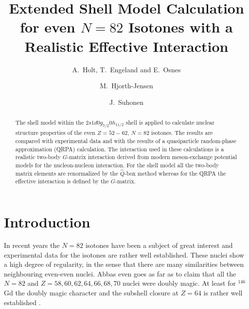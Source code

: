


\begin{frontmatter}

\title{Extended Shell Model Calculation for even $N=82$ Isotones with a 
Realistic Effective Interaction}

\author{A.\ Holt, T.\ Engeland and E.\ Osnes}

\address{Department of Physics, University of Oslo, N-0316 Oslo, Norway}

\author{M.\ Hjorth-Jensen}

\address{Nordita, Blegdamsvej 17, DK-2100 K\o benhavn \O, Denmark}

\author{J.\ Suhonen}

\address{Department of Physics, University of Jyv\"{a}skyl\"{a},
              P.O.Box 35, FIN-40351 Jyv\"{a}skyl\"{a}, Finland}

\maketitle

\begin{abstract}
The shell model within the $2s1d0g_{7/2}0h_{11/2}$ shell is applied to 
calculate nuclear structure properties of the even $Z=52 - 62$, $N=82$ 
isotones. The results are compared with experimental data and with the 
results of a quasiparticle random-phase approximation (QRPA) calculation.
The interaction used in these calculations is a realistic 
two-body $G$-matrix
interaction derived from modern meson-exchange potential models for the
nucleon-nucleon interaction. 
For the shell model all the 
two-body matrix elements are renormalized by the $\hat{Q}$-box method 
whereas for the QRPA the effective interaction is defined 
by the $G$-matrix.
\end{abstract}

\end{frontmatter}

\section{Introduction}

In recent years the $N=82$ isotones have been a subject of great interest and 
experimental data for the isotones are rather well established.  These nuclei 
show a high degree of regularity, in the sense that there are many 
similarities between neighbouring even-even nuclei. Abbas \cite{a84} even 
goes as far as to claim that all the $N=82$ and $Z=58, 60, 62, 64, 66, 68, 70$
nuclei were doubly magic. At least for $^{146}$Gd the doubly magic character 
and the subshell closure at $Z=64$ is rather well established 
\cite{wsg89,yjk86}.

